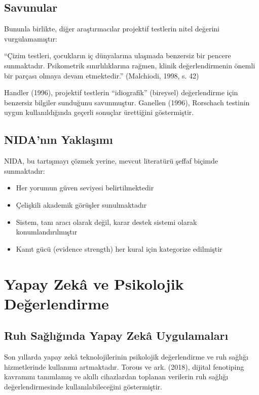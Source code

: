 \subsection{Savunular}

Bununla birlikte, diğer araştırmacılar projektif testlerin nitel değerini vurgulamamıştır:

\begin{quotebox}
``Çizim testleri, çocukların iç dünyalarına ulaşmada benzersiz bir pencere sunmaktadır. Psikometrik sınırlılıklarına rağmen, klinik değerlendirmenin önemli bir parçası olmaya devam etmektedir.'' (Malchiodi, 1998, s. 42)
\end{quotebox}

Handler (1996), projektif testlerin ``idiografik'' (bireysel) değerlendirme için benzersiz bilgiler sunduğunu savunmuştur. Ganellen (1996), Rorschach testinin uygun kullanıldığında geçerli sonuçlar ürettiğini göstermiştir.

\subsection{NIDA'nın Yaklaşımı}

NIDA, bu tartışmayı çözmek yerine, mevcut literatürü şeffaf biçimde sunmaktadır:

\begin{itemize}
  \item Her yorumun güven seviyesi belirtilmektedir
  \item Çelişkili akademik görüşler sunulmaktadır
  \item Sistem, tanı aracı olarak değil, karar destek sistemi olarak konumlandırılmıştır
  \item Kanıt gücü (evidence strength) her kural için kategorize edilmiştir
\end{itemize}

\section{Yapay Zekâ ve Psikolojik Değerlendirme}

\subsection{Ruh Sağlığında Yapay Zekâ Uygulamaları}

Son yıllarda yapay zekâ teknolojilerinin psikolojik değerlendirme ve ruh sağlığı hizmetlerinde kullanımı artmaktadır. Torous ve ark. (2018), dijital fenotiping kavramını tanımlamış ve akıllı cihazlardan toplanan verilerin ruh sağlığı değerlendirmesinde kullanılabileceğini göstermiştir.

